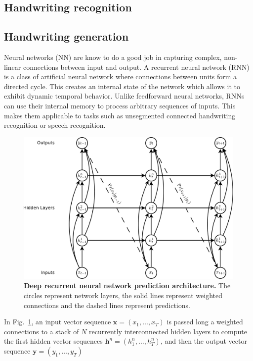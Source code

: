 \documentclass{article} %
\newcommand{\fref}[1]{Fig.~\ref{fig:#1}}
\newcommand{\flabel}[1]{\label{fig:#1}}
\begin{document}
\subsection{Handwriting recognition}
\subsection{Handwriting generation}

Neural networks (NN) are know to do a good job in capturing complex, non-linear connections between input and output. A recurrent neural network (RNN) is a class of artificial neural network where connections between units form a directed cycle. This creates an internal state of the network which allows it to exhibit dynamic temporal behavior. Unlike feedforward neural networks, RNNs can use their internal memory to process arbitrary sequences of inputs. This makes them applicable to tasks such as unsegmented connected handwriting recognition or speech recognition. 

\begin{figure}
\begin{center}
\includegraphics[scale = 0.3]{deep_predictor.pdf}
\caption{\textbf{Deep recurrent neural network prediction architecture.} The circles represent network layers, the solid lines represent weighted connections
and the dashed lines represent predictions. }
\flabel{deep_predictor}
\end{center}
\end{figure}

In \fref{deep_predictor}, an input vector sequence $\mathbf{x}=(x_1, \ldots, x_T)$ is passed long a weighted connections to a stack of $N$ recurrently interconnected hidden layers to compute the first hidden vector sequences $\mathbf{h}^n = (h^n_1,\ldots,h^n_T)$, and then the output vector sequence $\mathbf{y} = (y_1, \ldots, y_T)$
\end{document}
